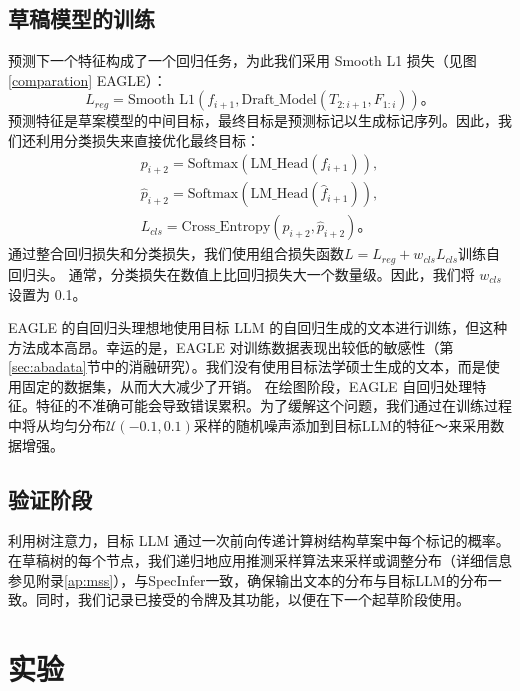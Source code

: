 \documentclass{article}
\theoremstyle{plain}
\theoremstyle{definition}
\theoremstyle{remark}
\begin{document}
\subsection{草稿模型的训练}

预测下一个特征构成了一个回归任务，为此我们采用 Smooth L1 损失（见图 \ref{comparation} EAGLE）：
\begin{equation*}
 L_{reg} = \text{Smooth L1}(f_{i+1}, \text{Draft\_Model}(T_{2:i+1}, F_{1:i}))。
\end{equation*} 
预测特征是草案模型的中间目标，最终目标是预测标记以生成标记序列。因此，我们还利用分类损失来直接优化最终目标：
\begin{gather*}
    {p}_{i+2}=\text{Softmax}(\text{LM\_Head}({f}_{i+1})), \\
    \hat{p}_{i+2}=\text{Softmax}(\text{LM\_Head}(\hat{f}_{i+1})), \\
 L_{cls} = \text{Cross\_Entropy}({p}_{i+2},\hat{p}_{i+2})。
\end{gather*}
通过整合回归损失和分类损失，我们使用组合损失函数$L=L_{reg}+w_{cls}L_{cls}$训练自回归头。
通常，分类损失在数值上比回归损失大一个数量级。因此，我们将 $w_{cls}$ 设置为 0.1。

EAGLE 的自回归头理想地使用目标 LLM 的自回归生成的文本进行训练，但这种方法成本高昂。幸运的是，EAGLE 对训练数据表现出较低的敏感性（第\ref{sec:abadata}节中的消融研究）。我们没有使用目标法学硕士生成的文本，而是使用固定的数据集，从而大大减少了开销。 
在绘图阶段，EAGLE 自回归处理特征。特征的不准确可能会导致错误累积。为了缓解这个问题，我们通过在训练过程中将从均匀分布$\mathcal{U}(-0.1, 0.1)$采样的随机噪声添加到目标LLM的特征〜\cite{jain2023neftune}来采用数据增强。



\subsection{验证阶段}
利用树注意力，目标 LLM 通过一次前向传递计算树结构草案中每个标记的概率。在草稿树的每个节点，我们递归地应用推测采样算法来采样或调整分布（详细信息参见附录\ref{ap:mss}），与SpecInfer\cite{miao2023specinfer}一致，确保输出文本的分布与目标LLM的分布一致。同时，我们记录已接受的令牌及其功能，以便在下一个起草阶段使用。


\label{me:ver}



\section{实验}
\end{document}
